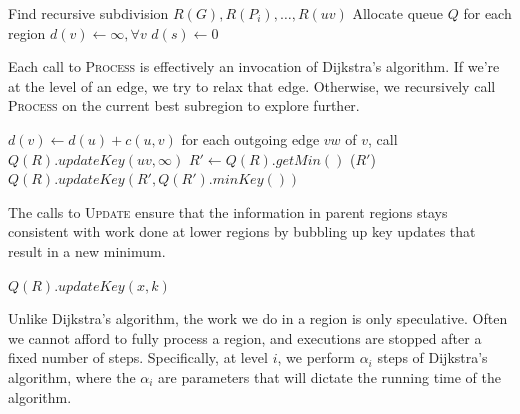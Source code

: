 \documentclass[11pt]{article}
\begin{document}
\begin{algorithm}
  \label{alg:linear}
  \begin{algorithmic}[1]
    \State Find recursive subdivision $R(G), R(P_i), \ldots, R(uv)$
    \State Allocate queue $Q$ for each region
    \State $d(v) \gets \infty, \forall v$
    \State $d(s) \gets 0$
      \State {}
    \EndFor
      \State {}
    \EndWhile
  \end{algorithmic}
\end{algorithm}

Each call to \textsc{Process} is effectively an invocation of Dijkstra's algorithm. If we're at the level of an edge, we try to relax that edge. Otherwise, we recursively call \textsc{Process} on the current best subregion to explore further.

\begin{algorithm}[!h]
  \label{alg:process}
  \begin{algorithmic}[1]
          \State $d(v) \gets d(u) + c(u,v)$
          \State for each outgoing edge $vw$ of $v$, call 
        \EndIf
        \State $Q(R).updateKey(uv,\infty)$
      \Else
        \Repeat
          \State $R' \gets Q(R).getMin()$
          \State {}($R'$)
          \State $Q(R).updateKey(R',Q(R').minKey())$
      \EndIf
    \EndProcedure
  \end{algorithmic}
\end{algorithm}

The calls to \textsc{Update} ensure that the information in parent regions stays consistent with work done at lower regions by bubbling up key updates that result in a new minimum.

\begin{algorithm}[!h]
  \label{alg:update}
  \begin{algorithmic}[1]
      \State $Q(R).updateKey(x,k)$
        \State {}
      \EndIf
    \EndProcedure
  \end{algorithmic}
\end{algorithm}

Unlike Dijkstra's algorithm, the work we do in a region is only speculative. Often we cannot afford to fully process a region, and executions are stopped after a fixed number of steps. Specifically, at level $i$, we perform $\alpha_i$ steps of Dijkstra's algorithm, where the $\alpha_i$ are parameters that will dictate the running time of the algorithm.
\end{document}
